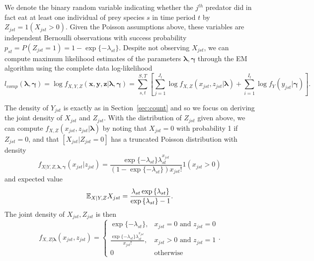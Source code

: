 \documentclass[smallextended]{svjour3}
\begin{document}
We denote the binary random variable indicating whether the $j^{th}$ predator did in fact eat at least one individual of prey species $s$ in time period $t$ by $Z_{jst} = 1(X_{jst} > 0)$.  Given the Poisson assumptions above, these variables are independent Bernoulli observations with success probability $p_{st} = P(Z_{jst}=1)= 1-\exp\{-\lambda_{st}\}$.  Despite not observing $X_{jst}$, we can compute maximum likelihood estimates of the parameters $\boldsymbol{\lambda}, \boldsymbol{\gamma}$ through the EM algorithm using the complete data log-likelihood
\[
l_{comp}(\boldsymbol{\lambda}, \boldsymbol{\gamma}) = \log f_{X,Y,Z}(\boldsymbol x, \boldsymbol y, \boldsymbol z|\boldsymbol{\lambda}, \boldsymbol{\gamma}) = \sum_{s,t}^{S,T} \left[ \sum_{j=1}^{J_t} \log f_{X,Z}(x_{jst},z_{jst}|\boldsymbol{\lambda}) + \sum_{i=1}^{I_t}\log f_Y(y_{jst}|\boldsymbol{\gamma}) \right].
\]

The density of $Y_{jst}$ is exactly as in Section~\ref{sec:count} and so we focus on deriving the joint density of $X_{jst}$ and $Z_{jst}$.  With the distribution of $Z_{jst}$ given above, we can compute $f_{X,Z}(x_{jst},z_{jst}|\boldsymbol{\lambda})$ by noting that $X_{jst}=0$ with probability 1 if $Z_{jst}=0$, and that $[X_{jst}|Z_{jst}=0]$ has a truncated Poisson distribution with density
\[
  f_{X|Y,Z,\boldsymbol{\lambda},\boldsymbol{\gamma}}(x_{jst}|z_{jst}) =
  \frac{\exp{\{-\lambda_{st}\}} \lambda_{st}^{x_{jst}}}{(1 - \exp{\{-\lambda_{st}\}}) x_{jst}!}1(x_{jst} > 0)
\]
and expected value
\[
\mathbb{E}_{X|Y,Z}X_{jst} = \frac{\lambda_{st} \exp{\{\lambda_{st} \}}}{\exp{\{ \lambda_{st} \}} - 1}.
\]
\noindent The joint density of $X_{jst}, Z_{jst}$ is then 
\begin{equation*}
    f_{X,Z|\boldsymbol{\lambda}}(x_{jst},z_{jst}) = \left\{
    \begin{array}{lr}
      \exp{\{ -\lambda_{st} \}}, & x_{jst}=0 \mbox{ and } z_{jst} = 0 \\
      \frac{\exp{\{-\lambda_{st} \}} \lambda_{st}^{x_{jst}}}{x_{jst}!}, & x_{jst} > 0 \mbox{ and } z_{jst} = 1 \\
      0 & \mbox{otherwise}
    \end{array}
  \right..
\end{equation*}
\end{document}
